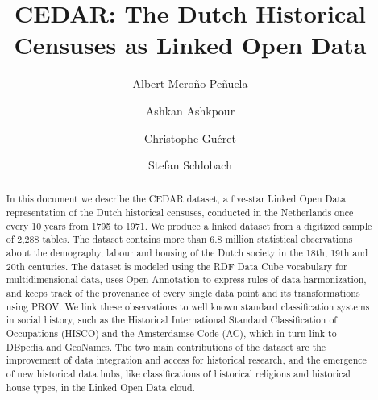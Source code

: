 \documentclass[runningheads,a4paper]{llncs}
\begin{document}
\mainmatter

\title{CEDAR: The Dutch Historical Censuses as Linked Open Data}
\author{Albert Meroño-Peñuela \and
Ashkan Ashkpour \and
Christophe Guéret \and
Stefan Schlobach}
\maketitle

\begin{abstract}
In this document we describe the CEDAR dataset, a five-star Linked Open Data representation of the Dutch historical censuses, conducted in the Netherlands once every 10 years from 1795 to 1971. We produce a linked dataset from a digitized sample of 2,288 tables. The dataset contains more than 6.8 million statistical observations about the demography, labour and housing of the Dutch society in the 18th, 19th and 20th centuries. The dataset is modeled using the RDF Data Cube vocabulary for multidimensional data, uses Open Annotation to express rules of data harmonization, and keeps track of the provenance of every single data point and its transformations using PROV. We link these observations to well known standard classification systems in social history, such as the Historical International Standard Classification of Occupations (HISCO) and the Amsterdamse Code (AC), which in turn link to DBpedia and GeoNames. The two main contributions of the dataset are the improvement of data integration and access for historical research, and the emergence of new historical data hubs, like classifications of historical religions and historical house types, in the Linked Open Data cloud.

\end{abstract}
\end{document}
